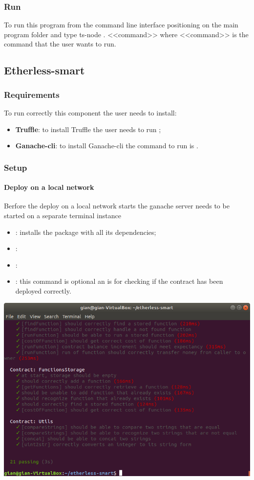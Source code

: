 \subsubsection{Run}
To run this program from the command line interface positioning on the main program folder
and type ts-node . <<command>> where <<command>> is the command that the user wants to run.
\subsection{Etherless-smart}
\subsubsection{Requirements}
To run correctly this component the user needs to install:
\begin{itemize}
    \item \textbf{Truffle}: to install Truffle the user needs to run ;
    \item \textbf{Ganache-cli}: to install Ganache-cli the command to run is .
\end{itemize}

\subsubsection{Setup}
\paragraph{Deploy on a local network}
Berfore the deploy on a local network starts the ganache server needs to be started on a separate terminal instance 
\begin{itemize}
    \item {} : installs the package with all its dependencies;    
    \item {}:
    \item {}:
    \item {}: this command is optional an is for checking if the contract has been deployed correctly.
\end{itemize}
\includegraphics[width=\textwidth]{res/img/truffleTest.png}
